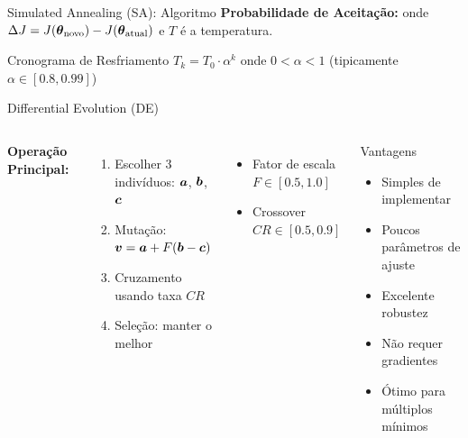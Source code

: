 \begin{frame}{Simulated Annealing (SA): Algoritmo}
\textbf{Probabilidade de Aceitação:}
onde $\Delta J = J(\boldsymbol{\theta}_{\text{novo}}) - J(\boldsymbol{\theta}_{\text{atual}})$ e $T$ é a temperatura.

\vspace{0.5cm}

\begin{exampleblock}{Cronograma de Resfriamento}
$T_k = T_0 \cdot \alpha^k$ onde $0 < \alpha < 1$ (tipicamente $\alpha \in [0.8, 0.99]$)
\end{exampleblock}
\end{frame}

\begin{frame}{Differential Evolution (DE)}

\begin{columns}
\textbf{Operação Principal:}
\begin{enumerate}\small
    \item Escolher 3 indivíduos: $\boldsymbol{a}$, $\boldsymbol{b}$, $\boldsymbol{c}$
    \item Mutação: $\boldsymbol{v} = \boldsymbol{a} + F(\boldsymbol{b} - \boldsymbol{c})$
    \item Cruzamento usando taxa $CR$
    \item Seleção: manter o melhor
\end{enumerate}
\begin{itemize}\small
    \item Fator de escala $F \in [0.5, 1.0]$
    \item Crossover $CR \in [0.5, 0.9]$
\end{itemize}

\begin{exampleblock}{Vantagens}\small
\begin{itemize}
    \item Simples de implementar
    \item Poucos parâmetros de ajuste
    \item Excelente robustez
    \item Não requer gradientes
    \item Ótimo para múltiplos mínimos
\end{itemize}
\end{exampleblock}
\end{columns}
\end{frame}

